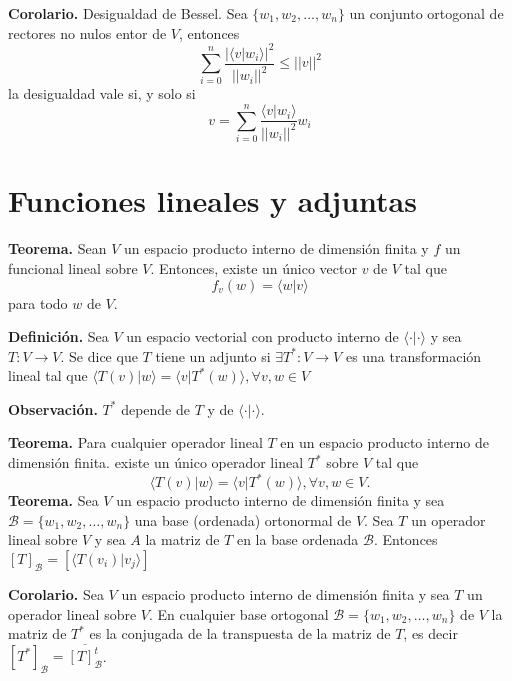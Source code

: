 \newpage
\textbf{Corolario.}  Desigualdad de Bessel. Sea $\{w_{1}, w_{2}, \dots, w_{n}\}$
un conjunto ortogonal de rectores no nulos entor de $V$, entonces
$$\displaystyle{\sum_{i=0}^{n}}\frac{|\langle v|w_{i}\rangle|^{2}}{||w_{i}||^2}\leq||v||^{2}$$
la desigualdad vale si, y solo si
$$v=\displaystyle{\sum_{i=0}^{n}} \frac{\langle v|w_{i} \rangle}{||w_{i}||^2}w_{i}$$

\section{Funciones lineales y adjuntas}

\textbf{Teorema.} Sean $V$ un espacio producto interno de dimensión finita y $f$ un
funcional lineal sobre $V$. Entonces, existe un único vector $v$ de $V$ tal que
$$f_{v}(w) = \langle w|v \rangle$$
para todo $w$ de $V$.

\textbf{Definición.} Sea $V$ un espacio vectorial con producto interno de
$\langle \cdot | \cdot \rangle$ y sea $T : V \to V$. Se dice que $T$ tiene
un adjunto si $\exists T^{\ast} : V \to V$  es una transformación lineal tal que
$\langle  T(v) | w \rangle=\langle  v | T^{\ast}(w) \rangle, \forall v, w \in V$

\textbf{Observación.} $T^{\ast}$ depende de $T$ y de $\langle \cdot | \cdot \rangle$.

\textbf{Teorema.} Para cualquier operador lineal $T$ en un espacio producto
interno de dimensión finita. existe un único operador lineal $T^{\ast}$ sobre
$V$ tal que $$\langle  T(v) | w \rangle=\langle  v | T^{\ast}(w) \rangle,
\forall v, w \in V.$$
\textbf{Teorema.} Sea $V$ un espacio producto interno de dimensión
finita y sea $\mathcal{B}=\{w_{1}, w_{2}, \dots, w_{n}\}$ una base
(ordenada) ortonormal de $V$. Sea $T$ un operador lineal sobre $V$
y sea $A$ la matriz de $T$ en la base ordenada $\mathcal{B}$. Entonces
$[T]_{\mathcal{B}}=[\langle  T(v_{i}) | v_{j}\rangle]$

\textbf{Corolario.} Sea $V$ un espacio producto interno de dimensión
finita y sea $T$ un operador lineal sobre $V$. En cualquier base
ortogonal $\mathcal{B}=\{w_{1}, w_{2}, \dots, w_{n}\}$ de $V$
la matriz de $T^{\ast}$ es la conjugada de la transpuesta de la
matriz de $T$, es decir $[T^{\ast}]_{\mathcal{B}} =\overline{[T]
	_{\mathcal{B}}^{t}}$.



